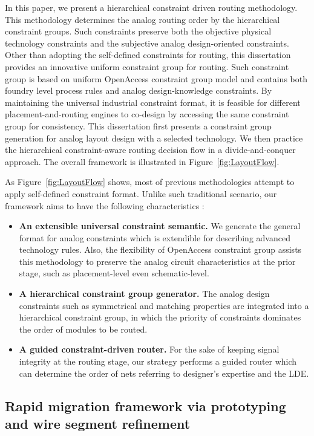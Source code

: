       In this paper, we present a hierarchical constraint driven routing methodology. This methodology determines the analog routing order by the hierarchical constraint groups. Such constraints preserve both the objective physical technology constraints and the subjective  analog design-oriented constraints. Other than adopting the self-defined constraints for routing, this dissertation provides an innovative uniform constraint group for routing. Such constraint group is based on uniform OpenAccess constraint group model and contains both foundry level process rules and analog design-knowledge constraints. By maintaining the universal industrial constraint format, it is feasible for different placement-and-routing engines to co-design by accessing the same constraint group for consistency. This dissertation first presents a constraint group generation for analog layout design with a selected technology. We then practice the hierarchical constraint-aware routing decision flow in a divide-and-conquer approach. The overall framework is illustrated in Figure~\ref{fig:LayoutFlow}. 
    

      As Figure~\ref{fig:LayoutFlow} shows, most of previous methodologies attempt to apply self-defined constraint format. Unlike such traditional scenario, our framework aims to have the following characteristics :
      \begin{itemize}
        \item {\bf An extensible universal constraint semantic.} We generate the general format for analog constraints which is extendible for describing advanced technology rules. Also, the flexibility of OpenAccess constraint group assists this methodology to preserve the analog circuit characteristics at the prior stage, such as placement-level even schematic-level.
        \item {\bf A hierarchical constraint group generator.} The analog design constraints such as symmetrical and matching properties are integrated into a hierarchical constraint group, in which the priority of constraints dominates the order of modules to be routed.
        \item {\bf A guided constraint-driven router.} For the sake of keeping signal integrity at the routing stage, our strategy performs a guided router which can determine the order of nets referring to designer's expertise and the LDE.
      \end{itemize}

    \subsection{Rapid migration framework via prototyping and wire segment refinement}

